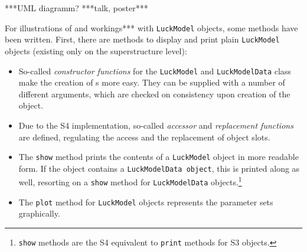 ***UML diagramm? ***talk, poster***


For illustrations of and workings*** with \texttt{LuckModel} objects, some methods have
been written. First, there are methods to display and print plain \texttt{LuckModel}
objects (existing only on the superstructure level):
\begin{itemize}
\item So-called \emph{constructor functions} for the \texttt{LuckModel} and \texttt{LuckModelData} class
   make the creation of \model s more easy. They can be supplied with a 
   number of different arguments, which are checked on consistency upon
   creation of the object.
\item Due to the S4 implementation, so-called \emph{accessor} and \emph{replacement functions}
   are defined, regulating the access and the replacement of object slots.
\item The \texttt{show} method prints the contents of a \texttt{LuckModel} object in more
   readable form. If the object contains a \texttt{LuckModelData object}, this is
   printed along as well, resorting on a \texttt{show} method for \texttt{LuckModelData}
   objects.\footnote{\texttt{show} methods are the S4 equivalent to \texttt{print} methods for S3 objects.}
\item The \texttt{plot} method for \texttt{LuckModel} objects represents the parameter sets graphically.
\end{itemize}

